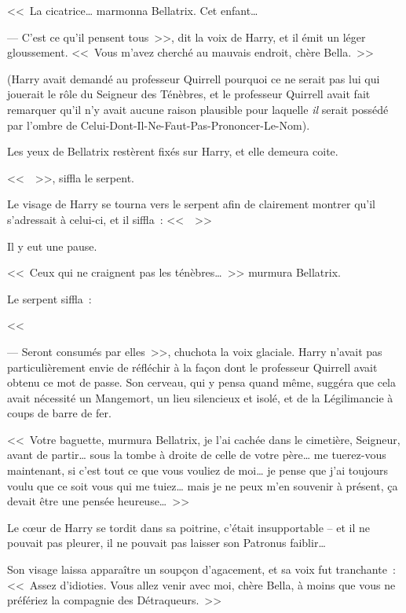 <<~La cicatrice… marmonna Bellatrix. Cet enfant…

--- C'est ce qu'il pensent tous~>>, dit la voix de Harry, et il émit un léger gloussement. <<~Vous m'avez cherché au mauvais endroit, chère Bella.~>>

(Harry avait demandé au professeur Quirrell pourquoi ce ne serait pas lui qui jouerait le rôle du Seigneur des Ténèbres, et le professeur Quirrell avait fait remarquer qu'il n'y avait aucune raison plausible pour laquelle \emph{il} serait possédé par l'ombre de Celui-Dont-Il-Ne-Faut-Pas-Prononcer-Le-Nom).

Les yeux de Bellatrix restèrent fixés sur Harry, et elle demeura coite.

<<~~>>, siffla le serpent.

Le visage de Harry se tourna vers le serpent afin de clairement montrer qu'il s'adressait à celui-ci, et il siffla~: <<~~>>

Il y eut une pause.

<<~Ceux qui ne craignent pas les ténèbres…~>> murmura Bellatrix.

Le serpent siffla~:

<<~

--- Seront consumés par elles~>>, chuchota la voix glaciale. Harry n'avait pas particulièrement envie de réfléchir à la façon dont le professeur Quirrell avait obtenu ce mot de passe. Son cerveau, qui y pensa quand même, suggéra que cela avait nécessité un Mangemort, un lieu silencieux et isolé, et de la Légilimancie à coups de barre de fer.

<<~Votre baguette, murmura Bellatrix, je l'ai cachée dans le cimetière, Seigneur, avant de partir… sous la tombe à droite de celle de votre père… me tuerez-vous maintenant, si c'est tout ce que vous vouliez de moi… je pense que j'ai toujours voulu que ce soit vous qui me tuiez… mais je ne peux m'en souvenir à présent, ça devait être une pensée heureuse…~>>

Le cœur de Harry se tordit dans sa poitrine, c'était insupportable -- et il ne pouvait pas pleurer, il ne pouvait pas laisser son Patronus faiblir…

Son visage laissa apparaître un soupçon d'agacement, et sa voix fut tranchante~: <<~Assez d'idioties. Vous allez venir avec moi, chère Bella, à moins que vous ne préfériez la compagnie des Détraqueurs.~>>

